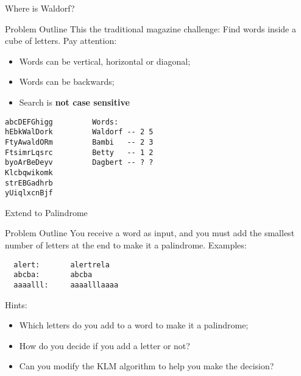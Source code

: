 \begin{frame}[fragile]{Where is Waldorf?}
  \begin{block}{Problem Outline}
    This the traditional magazine challenge: Find words inside a cube of letters. Pay attention:

    \begin{itemize}
      \item Words can be vertical, horizontal or diagonal;
      \item Words can be backwards;
      \item Search is {\bf not case sensitive}
    \end{itemize}
  \end{block}

\begin{verbatim}
abcDEFGhigg         Words:
hEbkWalDork         Waldorf -- 2 5
FtyAwaldORm         Bambi   -- 2 3
FtsimrLqsrc         Betty   -- 1 2
byoArBeDeyv         Dagbert -- ? ?
Klcbqwikomk
strEBGadhrb
yUiqlxcnBjf
\end{verbatim}
\end{frame}

\begin{frame}[fragile]{Extend to Palindrome}
  \begin{block}{Problem Outline}
    You receive a word as input, and you must add the smallest number of letters at the end to make it a palindrome. Examples:
\begin{verbatim}
  alert:       alertrela
  abcba:       abcba
  aaaalll:     aaaalllaaaa
\end{verbatim}
  \end{block}\bigskip

  Hints:
  \begin{itemize}
    \item Which letters do you add to a word to make it a palindrome;
    \item How do you decide if you add a letter or not?
    \item Can you modify the KLM algorithm to help you make the decision?
  \end{itemize}
\end{frame}

